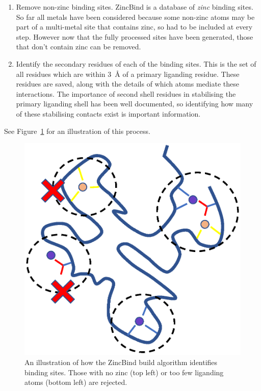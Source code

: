 \begin{enumerate}
   \item Remove non-zinc binding sites. ZincBind is a database of \emph{zinc} binding sites. So far all metals have been considered because some non-zinc atoms may be part of a multi-metal site that contains zinc, so had to be included at every step. However now that the fully processed sites have been generated, those that don't contain zinc can be removed.
   \item Identify the secondary residues of each of the binding sites. This is the set of all residues which are within 3~{\AA} of a primary liganding residue. These residues are saved, along with the details of which atoms mediate these interactions. The importance of second shell residues in stabilising the primary liganding shell has been well documented, so identifying how many of these stabilising contacts exist is important information.
\end{enumerate}

See Figure~\ref{fig:zincbind-build} for an illustration of this process.

\begin{figure}
\centering
\includegraphics[width=1.0\textwidth]{Figures/zincbind-build.eps}
\caption[The ZincBind build process.]{\label{fig:zincbind-build} An illustration of how the ZincBind build algorithm identifies binding sites. Those with no zinc (top left) or too few liganding atoms (bottom left) are rejected.}
\end{figure}

